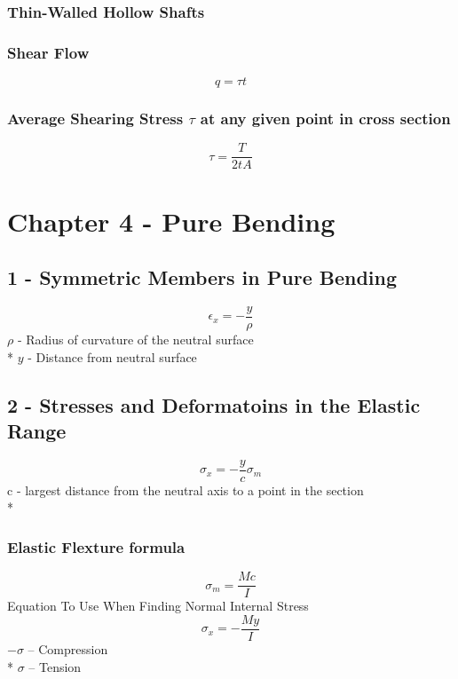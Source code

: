 \documentclass[10pt,landscape]{article}
\begin{document}
\begin{multicols}{3}
\subsubsection{Thin-Walled Hollow Shafts}
\subsubsection{Shear Flow}
\begin{equation}
    q=\tau t
\end{equation}
\subsubsection{Average Shearing Stress $\tau$ at any given point in cross section}
\begin{equation}
    \tau=\frac{T}{2tA}
\end{equation}

\section{Chapter 4 - Pure Bending}
\subsection{1 - Symmetric Members in Pure Bending}
\begin{equation}
    \epsilon_x=-\frac{y}{\rho}
\end{equation}
$\rho$ - Radius of curvature of the neutral surface\\*
$y$ - Distance from neutral surface
\subsection{2 - Stresses and Deformatoins in the Elastic Range}
\begin{equation}
    \sigma_x=-\frac{y}{c}\sigma_m
\end{equation}
c - largest distance from the neutral axis to a point in the section\\*
\subsubsection{Elastic Flexture formula}
\begin{equation}
    \sigma_m=\frac{Mc}{I}
\end{equation}
Equation To Use When Finding Normal Internal Stress
\begin{equation}
    \sigma_x=-\frac{My}{I}
\end{equation}
$-\sigma$ -- Compression\\*
 $\sigma$ -- Tension

\end{multicols}
\end{document}

